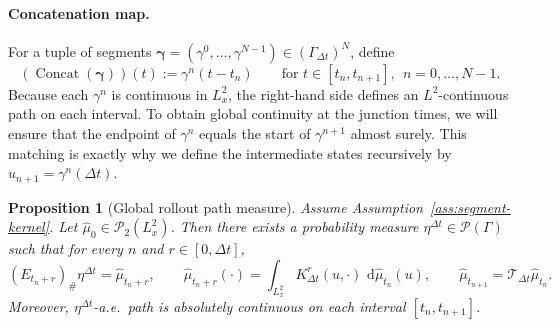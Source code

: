 \documentclass{article}
\numberwithin{equation}{section}
\theoremstyle{plain}
\newtheorem{proposition}[theorem]{Proposition}
\theoremstyle{definition}
\theoremstyle{remark}
\newcommand{\Pcal}{\mathcal{P}}
\newcommand{\dd}{\,\mathrm{d}}
\DeclareMathOperator{\Concat}{Concat}
\begin{document}
\paragraph{Concatenation map.}
For a tuple of segments $\bm\gamma=(\gamma^0,\dots,\gamma^{N-1})\in(\Gamma_{\Delta t})^N$, define
\begin{equation}\label{eq:concat-map}
(\Concat(\bm\gamma))(t):=\gamma^n(t-t_n)\qquad\text{for }t\in[t_n,t_{n+1}],\ \ n=0,\dots,N-1.
\end{equation}
Because each $\gamma^n$ is continuous in $L^2_x$, the right-hand side defines an $L^2$-continuous path on each interval.
To obtain global continuity at the junction times, we will ensure that the endpoint of $\gamma^n$ equals the start of $\gamma^{n+1}$
almost surely. This matching is exactly why we define the intermediate states recursively by $u_{n+1}=\gamma^n(\Delta t)$.

\begin{proposition}[Global rollout path measure]\label{prop:global-path-measure}
Assume Assumption~\ref{ass:segment-kernel}. Let $\widehat\mu_0\in\Pcal_2(L^2_x)$.
Then there exists a probability measure $\eta^{\Delta t}\in\Pcal(\Gamma)$ such that for every $n$ and $r\in[0,\Delta t]$,
\begin{equation}\label{eq:marginal-identity}
(E_{t_n+r})_\#\eta^{\Delta t}=\widehat\mu_{t_n+r},
\qquad
\widehat\mu_{t_n+r}(\cdot)=\int_{L^2_x}K^r_{\Delta t}(u,\cdot)\,\dd\widehat\mu_{t_n}(u),
\qquad
\widehat\mu_{t_{n+1}}=\mathcal T_{\Delta t}\widehat\mu_{t_n}.
\end{equation}
Moreover, $\eta^{\Delta t}$-a.e.\ path is absolutely continuous on each interval $[t_n,t_{n+1}]$.
\end{proposition}
\end{document}
